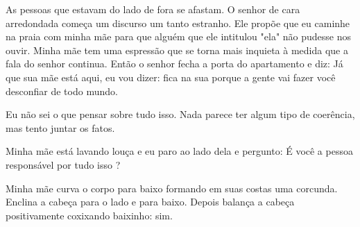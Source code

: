 \documentclass[11pt]{book}
\begin{document}
As pessoas que estavam do lado de fora se afastam. O senhor de cara arredondada começa um discurso um tanto estranho. Ele propõe que eu caminhe na praia com minha mãe para que alguém que ele intitulou "ela" não pudesse nos ouvir. Minha mãe tem uma espressão que se torna mais inquieta à medida que a fala do senhor continua. Então o senhor fecha a porta do apartamento e diz: Já que sua mãe está aqui, eu vou dizer: fica na sua porque a gente vai fazer você desconfiar de todo mundo. 

Eu não sei o que pensar sobre tudo isso. Nada parece ter algum tipo de coerência, mas tento juntar os fatos.

Minha mãe está lavando louça e eu paro ao lado dela e pergunto: É você a pessoa responsável por tudo isso ? 

Minha mãe curva o corpo para baixo formando em suas costas uma corcunda. Enclina a cabeça para o lado e para baixo. Depois balança a cabeça positivamente coxixando baixinho: sim.
\end{document}

